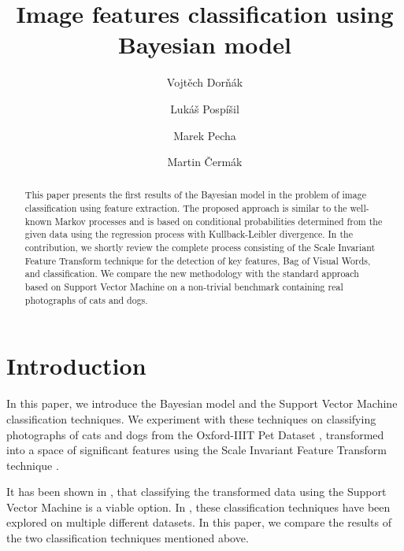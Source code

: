 \documentclass{aip-cp}
\begin{document}
\title{Image features classification using Bayesian model}

\author[aff1,aff2]{Vojt\v{e}ch Dor\v{n}\'{a}k}
\author[aff1]{Luk\'{a}\v{s} Posp\'{i}\v{s}il}
\author[aff2]{Marek Pecha}
\author[aff1]{Martin \v{C}erm\'{a}k}


\maketitle

\begin{abstract}
    This paper presents the first results of the Bayesian model in the problem of image classification using feature extraction. The proposed approach is similar to the well-known Markov processes and is based on conditional probabilities determined from the given data using the regression process with Kullback-Leibler divergence. In the contribution, we shortly review the complete process consisting of the Scale Invariant Feature Transform technique for the detection of key features, Bag of Visual Words, and classification. We compare the new methodology with the standard approach based on Support Vector Machine on a non-trivial benchmark containing real photographs of cats and dogs.
\end{abstract}

\maketitle

\section{Introduction}
In this paper, we introduce the Bayesian model and the Support Vector Machine classification techniques. We experiment with these techniques on classifying photographs of cats and dogs from the Oxford-IIIT Pet Dataset \cite{parkhi12a}, transformed into a space of significant features using the Scale Invariant Feature Transform technique \cite{Lowe2004}.

It has been shown in \cite{dornak2020}, that classifying the transformed data using the Support Vector Machine is a viable option. In \cite{dornak2021}, these classification techniques have been explored on multiple different datasets. In this paper, we compare the results of the two classification techniques mentioned above.
\end{document}
